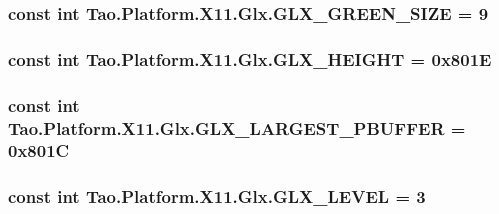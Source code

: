 \label{class_tao_1_1_platform_1_1_x11_1_1_glx_a1c8bf824a1ae02d7bae31010865313f2}
\hypertarget{class_tao_1_1_platform_1_1_x11_1_1_glx_a4ea44baa5ca696ca9e15ca33a006f574}{
\subsubsection[{GLX\_\-GREEN\_\-SIZE}]{\setlength{\rightskip}{0pt plus 5cm}const int {\bf Tao.Platform.X11.Glx.GLX\_\-GREEN\_\-SIZE} = 9}}
\label{class_tao_1_1_platform_1_1_x11_1_1_glx_a4ea44baa5ca696ca9e15ca33a006f574}
\hypertarget{class_tao_1_1_platform_1_1_x11_1_1_glx_acd3e11028d125afbbf1e8a34b156e44a}{
\subsubsection[{GLX\_\-HEIGHT}]{\setlength{\rightskip}{0pt plus 5cm}const int {\bf Tao.Platform.X11.Glx.GLX\_\-HEIGHT} = 0x801E}}
\label{class_tao_1_1_platform_1_1_x11_1_1_glx_acd3e11028d125afbbf1e8a34b156e44a}
\hypertarget{class_tao_1_1_platform_1_1_x11_1_1_glx_a19dcd43808f2415373c4f1369ac0b881}{
\subsubsection[{GLX\_\-LARGEST\_\-PBUFFER}]{\setlength{\rightskip}{0pt plus 5cm}const int {\bf Tao.Platform.X11.Glx.GLX\_\-LARGEST\_\-PBUFFER} = 0x801C}}
\label{class_tao_1_1_platform_1_1_x11_1_1_glx_a19dcd43808f2415373c4f1369ac0b881}
\hypertarget{class_tao_1_1_platform_1_1_x11_1_1_glx_a9413f7ed62658e17be5cfec7fa63f08d}{
\subsubsection[{GLX\_\-LEVEL}]{\setlength{\rightskip}{0pt plus 5cm}const int {\bf Tao.Platform.X11.Glx.GLX\_\-LEVEL} = 3}}
